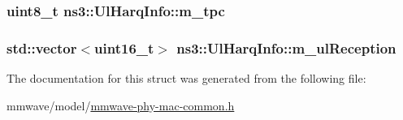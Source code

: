 \subsubsection[{\texorpdfstring{m\+\_\+tpc}{m_tpc}}]{\setlength{\rightskip}{0pt plus 5cm}uint8\+\_\+t ns3\+::\+Ul\+Harq\+Info\+::m\+\_\+tpc}\hypertarget{structns3_1_1UlHarqInfo_a59952a2ca0b92f8e4bcf80a0fd32b82d}{}\label{structns3_1_1UlHarqInfo_a59952a2ca0b92f8e4bcf80a0fd32b82d}
\subsubsection[{\texorpdfstring{m\+\_\+ul\+Reception}{m_ulReception}}]{\setlength{\rightskip}{0pt plus 5cm}std\+::vector$<$uint16\+\_\+t$>$ ns3\+::\+Ul\+Harq\+Info\+::m\+\_\+ul\+Reception}\hypertarget{structns3_1_1UlHarqInfo_af288dc402b2d70c2a78b41b9aa6a0ffc}{}\label{structns3_1_1UlHarqInfo_af288dc402b2d70c2a78b41b9aa6a0ffc}


The documentation for this struct was generated from the following file\+:\begin{DoxyCompactItemize}
\item 
mmwave/model/\hyperlink{mmwave-phy-mac-common_8h}{mmwave-\/phy-\/mac-\/common.\+h}\end{DoxyCompactItemize}
